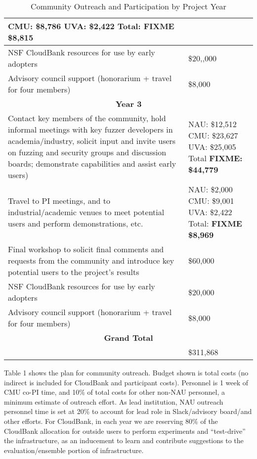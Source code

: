 \documentclass[12pt]{article}
\begin{document}
\begin{table}
\begin{tabular}{|p{12cm}|p{3cm}|}
                                                       CMU: \$8,786
                                                       UVA:  \$2,422
                                                       Total: \textbf{FIXME \$8,815}\\
    \hline
    NSF CloudBank resources for use by early adopters & \$20,,000 \\
    \hline 
    Advisory council support (honorarium + travel for four members) & \$8,000 \\    
    \hline
    \hline
    \multicolumn{2}{c}{{\bf Year 3}} \\
    \hline
    \hline
   Contact key members of the community, hold informal meetings with
    key fuzzer developers in academia/industry, solicit input and
    invite users
    on fuzzing and security groups and discussion boards; demonstrate
    capabilities and assist early users) &  NAU:   \$12,512 CMU: \$23,627 UVA: \$25,005
                                                      Total \textbf{FIXME:  \$44,779} \\
    \hline
    Travel to PI meetings, and to industrial/academic venues to meet
    potential users and perform demonstrations, etc. & NAU: \$2,000
                                                       CMU: \$9,001
                                                       UVA:  \$2,422
                                                       Total: \textbf{FIXME \$8,969}\\
    \hline    
    Final workshop to solicit final comments and requests from the
    community and introduce key potential users to the project’s
    results & \$60,000 \\
    \hline
    NSF CloudBank resources for use by early adopters & \$20,000 \\
    \hline 
    Advisory council support (honorarium + travel for four members) & \$8,000 \\    
    \hline
    \hline
    \multicolumn{2}{c}{{\bf Grand Total}} \\
    \hline
                   &     \$311,868 \\
                     \hline
 
  \end{tabular}
\label{outreach}
  \caption{Community Outreach and Participation by Project Year}
  
\end{table}


Table 1 shows the plan for community
outreach.   Budget shown is total costs 
 (no indirect is included for CloudBank and participant costs).   Personnel is 1 week of CMU co-PI time, and 10\%
of total costs for other non-NAU personnel, a
minimum estimate of outreach effort.  As lead institution, NAU
outreach personnel time is set at 20\% to account for lead role in
Slack/advisory board/and other efforts.  For CloudBank, in each year we
are reserving 80\% of the CloudBank allocation for outside users to
perform experiments and ``test-drive'' the infrastructure, as an
inducement to learn and contribute suggestions to the
evaluation/ensemble portion of infrastructure.
\end{document}
